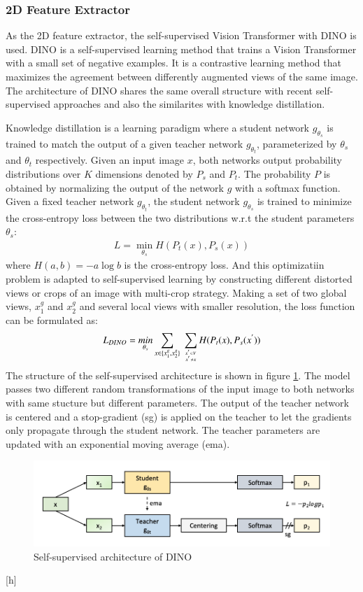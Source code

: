 \documentclass[12pt,DIV14,BCOR12mm,a4paper,footinclude=false,headinclude,parskip=half-,twoside,openright,cleardoublepage=empty,toc=index,bibliography=totoc,listof=totoc]{scrreprt}
\numberwithin{equation}{chapter}
\begin{document}
\subsubsection{2D Feature Extractor}
As the 2D feature extractor, the self-supervised Vision Transformer
 with DINO\cite{caron2021emerging} is used. DINO is a self-supervised learning method that trains a Vision Transformer
 with a small set of negative examples. It is a contrastive learning method that maximizes the agreement between differently augmented views of the same image. The architecture of DINO shares the same overall structure with recent self-supervised approaches and also the similarites with knowledge distillation.

Knowledge distillation is a learning paradigm where a student network $g_{\theta_{s}}$ is trained to match the output of a given teacher network $g_{\theta_{t}}$, parameterized by $\theta_{s}$ and $\theta_{t}$ respectively. Given an input image $x$, both networks output probability distributions over $K$ dimensions denoted by $P_{s}$ and $P_{t}$. The probability $P$ is obtained by normalizing the output of the network $g$ with a softmax function. Given a fixed teacher network $g_{\theta_{t}}$, the student network $g_{\theta_{s}}$ is trained to minimize the cross-entropy loss between the two distributions w.r.t the student parameters $\theta_{s}$:
\begin{align}
  L = \mathop{min}_{\theta_{s}}H(P_{t}(x), P_{s}(x))
\end{align}
where $H(a,b)=-a \log b$ is the cross-entropy loss. And this optimizatiin problem is adapted to self-supervised learning by constructing different distorted views or crops of an image with multi-crop strategy. Making a set of two global views, $x_{1}^{g}$ and $x_{2}^{g}$ and several local views with smaller resolution, the loss function can be formulated as:
\begin{align}
  L_{DINO}=\mathop{min}_{\theta_{s}}\mathop{\sum}_{x\in \{x_{1}^{g},x_{2}^{g}\}} \ \mathop{\sum}_{x^{'}\in V \atop x^{'}\neq x}H(P_{t}(x), P_{s}(x^{'}))
\end{align}
The structure of the self-supervised architecture is shown in figure \ref{img:dino}. The model passes two different random transformations of the input image to both networks with same stucture but different parameters. The output of the teacher network is centered and a stop-gradient (sg) is applied on the teacher to let the gradients only propagate through the student network. The teacher parameters are updated with an exponential moving average (ema).
\begin{figure}
	\centering
	\includegraphics[scale=.38]{img/dino.png}
	\caption{Self-supervised architecture of DINO}
	\label{img:dino}
\end{figure}[h]
\end{document}
